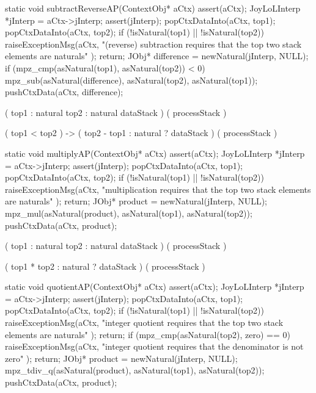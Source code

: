 \stopWord

\stoptyping

\startCCode
static void subtractReverseAP(ContextObj* aCtx) {
  assert(aCtx);
  JoyLoLInterp *jInterp = aCtx->jInterp;
  assert(jInterp);
  popCtxDataInto(aCtx, top1);
  popCtxDataInto(aCtx, top2);
  if (!isNatural(top1) || !isNatural(top2)) {
    raiseExceptionMsg(aCtx,
      "(reverse) subtraction requires that the top two stack elements are naturals"
    );
    return;
  }
  JObj* difference = newNatural(jInterp, NULL);
  if (mpz_cmp(asNatural(top1), asNatural(top2)) < 0) {
    mpz_sub(asNatural(difference), asNatural(top2), asNatural(top1));
  }
  pushCtxData(aCtx, difference);
}
\stopCCode

\starttyping

\startWord[subtractReverse]

\preDataStack
  (
    top1 : natural
    top2 : natural
    dataStack
  )
\preProcessStack
  ( processStack )
\preConditions
\stopPreStack

\postDataStack
  ( top1 < top2 ) -> (
    top2 - top1 : natural ?
    dataStack
  )
\postProcessStack
  ( processStack )
\postConditions
\stopPostStack

\stopWord

\stoptyping

\startCCode
static void multiplyAP(ContextObj* aCtx) {
  assert(aCtx);
  JoyLoLInterp *jInterp = aCtx->jInterp;
  assert(jInterp);
  popCtxDataInto(aCtx, top1);
  popCtxDataInto(aCtx, top2);
  if (!isNatural(top1) || !isNatural(top2)) {
    raiseExceptionMsg(aCtx,
      "multiplication requires that the top two stack elements are naturals"
    );
    return;
  }
  JObj* product = newNatural(jInterp, NULL);
  mpz_mul(asNatural(product), asNatural(top1), asNatural(top2));
  pushCtxData(aCtx, product);
}
\stopCCode

\starttyping

\startWord[mulitply]

\preDataStack
  (
    top1 : natural
    top2 : natural
    dataStack
  )
\preProcessStack
  ( processStack )
\preConditions
\stopPreStack

\postDataStack
  (
    top1 * top2 : natural ?
    dataStack
  )
\postProcessStack
  ( processStack )
\postConditions
\stopPostStack

\stopWord

\stoptyping

\startCCode
static void quotientAP(ContextObj* aCtx) {
  assert(aCtx);
  JoyLoLInterp *jInterp = aCtx->jInterp;
  assert(jInterp);
  popCtxDataInto(aCtx, top1);
  popCtxDataInto(aCtx, top2);
  if (!isNatural(top1) || !isNatural(top2)) {
    raiseExceptionMsg(aCtx,
      "integer quotient requires that the top two stack elements are naturals"
    );
    return;
  }
  if (mpz_cmp(asNatural(top2), zero) == 0) {
    raiseExceptionMsg(aCtx,
      "integer quotient requires that the denominator is not zero"
    );
    return;
  }
  JObj* product = newNatural(jInterp, NULL);
  mpz_tdiv_q(asNatural(product), asNatural(top1), asNatural(top2));
  pushCtxData(aCtx, product);
}

